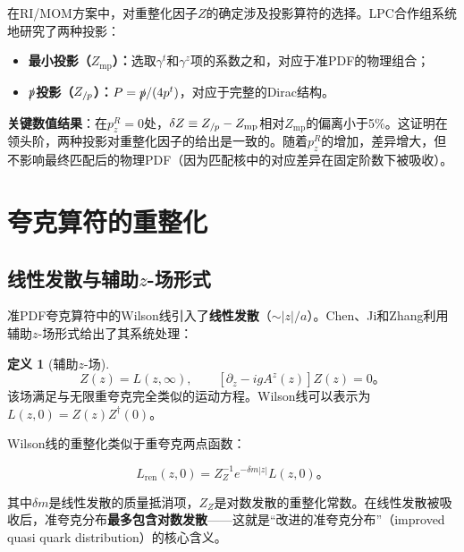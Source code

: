 \documentclass[12pt,a4paper]{ctexart}
\theoremstyle{definition}
\newtheorem{definition}{定义}[section]
\begin{document}
在RI/MOM方案中，对重整化因子$Z$的确定涉及投影算符的选择\cite{Liu2019isovector}。LPC合作组系统地研究了两种投影：

\begin{itemize}
    \item \textbf{最小投影（$Z_{\text{mp}}$）：}选取$\gamma^t$和$\gamma^z$项的系数之和，对应于准PDF的物理组合；
    \item \textbf{$\slashed{p}$投影（$Z_{/\mskip-1mu p}$）：}$P = \slashed{p}/(4p^t)$，对应于完整的Dirac结构。
\end{itemize}

\textbf{关键数值结果}\cite{Liu2019isovector}：在$p^R_z = 0$处，$\delta Z \equiv Z_{/\mskip-1mu p} - Z_{\text{mp}}$相对$Z_{\text{mp}}$的偏离小于5\%。这证明在领头阶，两种投影对重整化因子的给出是一致的。随着$p^R_z$的增加，差异增大，但不影响最终匹配后的物理PDF（因为匹配核中的对应差异在固定阶数下被吸收）。

\section{夸克算符的重整化}

\subsection{线性发散与辅助$z$-场形式}

准PDF夸克算符中的Wilson线引入了\textbf{线性发散}（$\sim |z|/a$）。Chen、Ji和Zhang\cite{Chen2016improved}利用辅助$z$-场形式给出了其系统处理：

\begin{definition}[辅助$z$-场]
\begin{equation}
Z(z) = L(z, \infty), \qquad [\partial_z - igA^z(z)] Z(z) = 0。
\label{eq:Z_field}
\end{equation}
该场满足与无限重夸克完全类似的运动方程。Wilson线可以表示为$L(z,0) = Z(z)Z^\dagger(0)$。
\end{definition}

Wilson线的重整化类似于重夸克两点函数\cite{Chen2016improved}：

\begin{equation}
\boxed{L_{\text{ren}}(z, 0) = Z^{-1}_Z e^{-\delta m |z|} L(z, 0)}。
\label{eq:Wilson_renorm}
\end{equation}

其中$\delta m$是线性发散的质量抵消项，$Z_Z$是对数发散的重整化常数。在线性发散被吸收后，准夸克分布\textbf{最多包含对数发散}——这就是``改进的准夸克分布''（improved quasi quark distribution）的核心含义\cite{Chen2016improved}。
\end{document}
